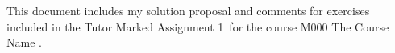\documentclass{TMA}
\def \myCourse {
M000 The Course Name
}
\def \myTMANumber {1}
\begin{document}
%

This document includes my solution proposal and comments for exercises included in the Tutor Marked Assignment \myTMANumber\ for the course \myCourse.

\tableofcontents

%
%


\end{document}
